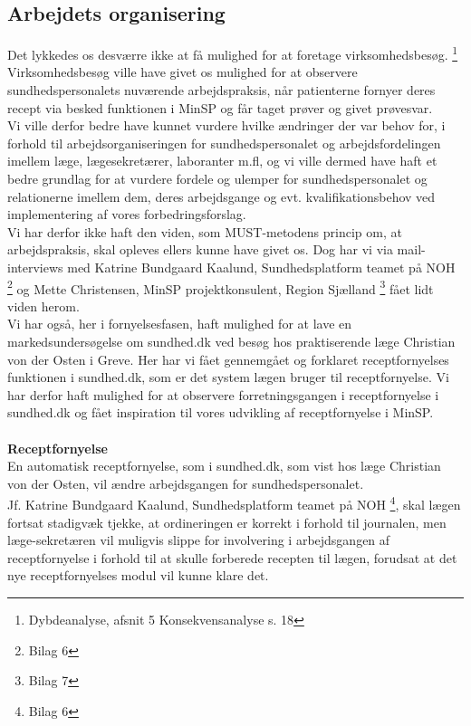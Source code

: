 \subsection{Arbejdets organisering} 
Det lykkedes os desværre ikke at få mulighed for at foretage virksomhedsbesøg. \footnote{Dybdeanalyse, afsnit 5 Konsekvensanalyse s. 18} Virksomhedsbesøg ville have givet os mulighed for at observere sundhedspersonalets nuværende arbejdspraksis, når patienterne fornyer deres recept via besked funktionen i MinSP og får taget prøver og givet prøvesvar.\\ 
Vi ville derfor bedre have kunnet vurdere hvilke ændringer der var behov for, i forhold til arbejdsorganiseringen for sundhedspersonalet og arbejdsfordelingen imellem læge, lægesekretærer, laboranter m.fl, og vi ville dermed have haft et bedre grundlag for at vurdere fordele og ulemper for sundhedspersonalet og relationerne imellem dem, deres arbejdsgange og evt. kvalifikationsbehov ved implementering af vores forbedringsforslag.\\
Vi har derfor ikke haft den viden, som MUST-metodens princip om, at arbejdspraksis, skal opleves ellers kunne have givet os. Dog har vi via mail-interviews med Katrine Bundgaard Kaalund, Sundhedsplatform teamet på NOH \footnote{Bilag 6} og  Mette Christensen, MinSP projektkonsulent, Region Sjælland \footnote{Bilag 7} fået lidt viden herom. \\
Vi har også, her i fornyelsesfasen, haft mulighed for at lave en markedsundersøgelse om sundhed.dk ved besøg hos praktiserende læge Christian von der Osten i Greve. Her har vi fået gennemgået og forklaret receptfornyelses funktionen i sundhed.dk, som er det system lægen bruger til receptfornyelse. Vi har derfor haft mulighed for at observere forretningsgangen i receptfornyelse i sundhed.dk og fået inspiration til vores udvikling af receptfornyelse i MinSP.\\\\
\textbf{Receptfornyelse} \\
En automatisk receptfornyelse, som i sundhed.dk, som vist hos læge Christian von der Osten, vil ændre arbejdsgangen for sundhedspersonalet. \\ 
Jf. Katrine Bundgaard Kaalund, Sundhedsplatform teamet på NOH \footnote{Bilag 6}, skal lægen fortsat stadigvæk tjekke, at ordineringen er korrekt i forhold til journalen, men læge-sekretæren vil muligvis slippe for involvering i arbejdsgangen af receptfornyelse i forhold til at skulle forberede recepten til lægen, forudsat at det nye receptfornyelses modul vil kunne klare det.\\
